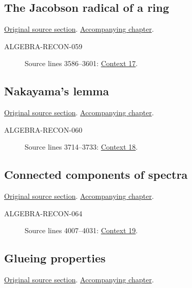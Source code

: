 \subsection{The Jacobson radical of a ring}
\hypertarget{algebra-source-section-radical}{}
\noindent\href{https://github.com/stacks/stacks-project/blob/a04446e57ec1fbc252a871afcec7752fb2807b14/algebra.tex\#L3546}{Original source section}. \href{algebra.pdf\#nameddest=section-radical}{Accompanying chapter}.

\begin{description}
\item[ALGEBRA-RECON-059] Source lines 3586--3601: \hyperlink{algebra-context-017}{Context 17}.
\end{description}

\subsection{Nakayama's lemma}
\hypertarget{algebra-source-section-nakayama}{}
\noindent\href{https://github.com/stacks/stacks-project/blob/a04446e57ec1fbc252a871afcec7752fb2807b14/algebra.tex\#L3606}{Original source section}. \href{algebra.pdf\#nameddest=section-nakayama}{Accompanying chapter}.

\begin{description}
\item[ALGEBRA-RECON-060] Source lines 3714--3733: \hyperlink{algebra-context-018}{Context 18}.
\end{description}

\subsection{Connected components of spectra}
\hypertarget{algebra-source-section-connected-components}{}
\noindent\href{https://github.com/stacks/stacks-project/blob/a04446e57ec1fbc252a871afcec7752fb2807b14/algebra.tex\#L3958}{Original source section}. \href{algebra.pdf\#nameddest=section-connected-components}{Accompanying chapter}.

\begin{description}
\item[ALGEBRA-RECON-064] Source lines 4007--4031: \hyperlink{algebra-context-019}{Context 19}.
\end{description}

\subsection{Glueing properties}
\hypertarget{algebra-source-section-more-glueing}{}
\noindent\href{https://github.com/stacks/stacks-project/blob/a04446e57ec1fbc252a871afcec7752fb2807b14/algebra.tex\#L4041}{Original source section}. \href{algebra.pdf\#nameddest=section-more-glueing}{Accompanying chapter}.

